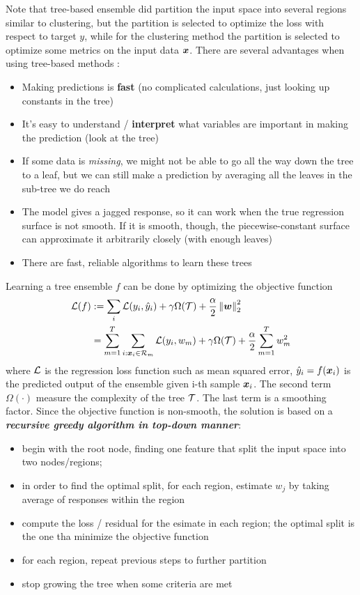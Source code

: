\documentclass[11pt]{article}
\begin{document}
Note that tree-based ensemble did partition the input space into several regions similar to clustering, but the partition is selected to optimize the loss with respect to target $y$, while for the clustering method the partition is selected to optimize some metrics on the input data $\boldsymbol{x}$. There are several advantages when using tree-based methods \citep{hastie2009elements}:
\begin{itemize}
\item Making predictions is \textbf{fast} (no complicated calculations, just looking up
constants in the tree)
\item It’s easy to understand / \textbf{interpret} what variables are important in making the prediction (look at the tree)
\item If some data is \emph{missing}, we might not be able to go all the way down the
tree to a leaf, but we can still make a prediction by averaging all the leaves
in the sub-tree we do reach
\item The model gives a jagged response, so it can work when the true regression
surface is not smooth. If it is smooth, though, the piecewise-constant
surface can approximate it arbitrarily closely (with enough leaves)
\item There are fast, reliable algorithms to learn these trees
\end{itemize}



Learning a tree ensemble $f$ can be done by optimizing the objective function 
\begin{align*}
{\mathcal L}(f) &:= \sum_{i}{\mathcal L}(y_i, \hat{y}_{i}) +\gamma \Omega({\mathcal T}) + \frac{\alpha}{2} \left\|\boldsymbol{w}\right\|_{2}^{2} \\
&= \sum_{m=1}^{T}\sum_{i: \boldsymbol{x}_{i} \in {\mathcal R}_{m}}{\mathcal L}(y_i, w_{m}) +\gamma \Omega({\mathcal T}) + \frac{\alpha}{2}\sum_{m=1}^{T} w_{m}^{2} 
\end{align*}
where ${\mathcal L}$ is the regression loss function such as mean squared error, $\hat{y}_{i} = f(\boldsymbol{x}_{i})$ is the predicted output of the ensemble given i-th sample $\boldsymbol{x}_{i}$. The second term  $\Omega(\cdot)$ measure the complexity of the tree ${\mathcal T}$. The last term is a smoothing factor. Since the objective function is non-smooth, the solution is based on a \emph{\textbf{recursive greedy algorithm in top-down manner}}: 

\begin{itemize}
\item begin with the root node, finding one feature that split the input space into two nodes/regions;
\item in order to find the optimal split, for each region, estimate $w_{j}$ by taking average of responses within the region
\item compute the loss / residual for the esimate in each region; the optimal split is the one tha minimize the objective function
\item for each region, repeat previous steps to further partition
\item stop growing the tree when some criteria are met
\end{itemize}
\end{document}
